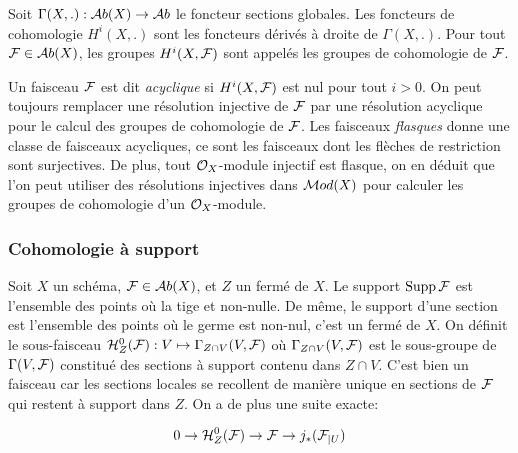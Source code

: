 \begin{defn}
Soit $\Gamma(X,.):\mathcal{A} b(X)\rightarrow \mathcal{A} b$ le foncteur sections globales. Les foncteurs de cohomologie $H^i(X,.)$ sont les foncteurs dérivés à droite de $\Gamma(X,.)$. Pour tout $\mathcal{F}\in \mathcal{A} b(X)$, les groupes $H^i(X,\mathcal{F})$ sont appelés les groupes de cohomologie de $\mathcal{F}$.
\end{defn}


Un faisceau $\mathcal{F}$ est dit \textit{acyclique} si $H^i(X,\mathcal{F})$ est nul pour tout $i>0$. On peut toujours remplacer une résolution injective de $\mathcal{F}$ par une résolution acyclique pour le calcul des groupes de cohomologie de $\mathcal{F}$. Les faisceaux \textit{flasques} donne une classe de faisceaux acycliques, ce sont les faisceaux dont les flèches de restriction sont surjectives. De plus, tout $\mathcal{O}_X$-module injectif est flasque, on en déduit que l'on peut utiliser des résolutions injectives dans $\mathcal{M} od(X)$ pour calculer les groupes de cohomologie d'un $\mathcal{O}_X$-module.

\subsubsection{Cohomologie à support}

Soit $X$ un schéma, $\mathcal{F}\in \mathcal{A} b(X)$, et $Z$ un fermé de $X$. Le support $\operatorname{Supp}\mathcal{F}$ est l'ensemble des points où la tige et non-nulle. De même, le support d'une section est l'ensemble des points où le germe est non-nul, c'est un fermé de $X$. On définit le sous-faisceau $\mathcal{H} ^0 _Z(\mathcal{F}):V\mapsto \Gamma_{Z\cap V}(V,\mathcal{F})$ où $\Gamma_{Z\cap V}(V,\mathcal{F})$ est le sous-groupe de $\Gamma(V,\mathcal{F})$ constitué des sections à support contenu dans $Z\cap V$. C'est bien un faisceau car les sections locales se recollent de manière unique en sections de $\mathcal{F}$ qui restent à support dans $Z$. On a de plus une suite exacte:


\begin{equation}\label{eq:ESSupport}
0\rightarrow \mathcal{H}^0 _Z(\mathcal{F}) \rightarrow \mathcal{F} \rightarrow j_*(\mathcal{F}_{|U})
\end{equation}

